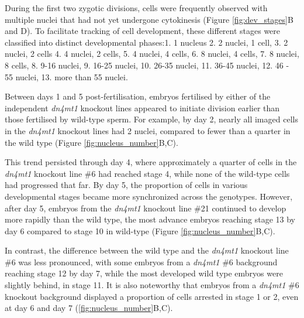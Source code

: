 During the first two zygotic divisions, cells were frequently observed with multiple nuclei that had not yet undergone cytokinesis (Figure \ref{fig:dev_stages}B and D).  To facilitate tracking of cell development, these different stages were classified into distinct developmental phases:1. 1 nucleus 2. 2 nuclei, 1 cell, 3. 2 nuclei, 2 cells 4. 4 nuclei, 2 cells, 5. 4 nuclei, 4 cells, 6. 8 nuclei, 4 cells, 7. 8 nuclei, 8 cells, 8. 9-16 nuclei, 9. 16-25 nuclei, 10. 26-35 nuclei, 11. 36-45 nuclei, 12. 46 - 55 nuclei, 13. more than 55 nuclei.

Between days 1 and 5 post-fertilisation, embryos fertilised by either of the independent \textit{dn4mt1} knockout lines appeared to initiate division earlier than those fertilised by wild-type sperm. For example, by day 2, nearly all imaged cells in the \textit{dn4mt1} knockout lines had 2 nuclei, compared to fewer than a quarter in the wild type (Figure \ref{fig:nucleus_number}B,C).  

This trend persisted through day 4, where approximately a quarter of cells in the \textit{dn4mt1} knockout line \#6 had reached stage 4, while none of the wild-type cells had progressed that far. By day 5, the proportion of cells in various developmental stages became more synchronized across the genotypes. However, after day 5, embryos from the \textit{dn4mt1} knockout line \#21 continued to develop more rapidly than the wild type, the most advance embryos reaching stage 13 by day 6 compared to stage 10 in wild-type (Figure \ref{fig:nucleus_number}B,C). 

In contrast, the difference between the wild type and the \textit{dn4mt1} knockout line \#6 was less pronounced, with some embryos from a \textit{dn4mt1} \#6 background reaching stage 12 by day 7, while the most developed wild type embryos were slightly behind, in stage 11. It is also noteworthy that embryos from a  \textit{dn4mt1} \#6 knockout background displayed a proportion of cells arrested in stage 1 or 2, even at day 6 and day 7 (\ref{fig:nucleus_number}B,C).


